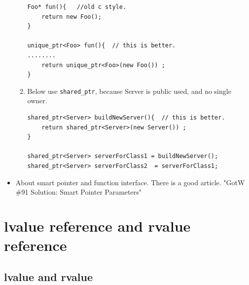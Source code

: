 \documentclass[a4paper,11pt,twoside]{book}
\begin{document}
\begin{itemize}
\begin{enumerate}
\begin{lstlisting}[numbers=none]
Foo* fun(){   //old c style.
	return new Foo();
}

unique_ptr<Foo> fun(){  // this is better.
........
	return unique_ptr<Foo>(new Foo()) ;
}
\end{lstlisting}

\item Below use \texttt{shared\_ptr}, because Server is public used, and no single owner.
\begin{lstlisting}[numbers=none]
shared_ptr<Server> buildNewServer(){  // this is better.
	return shared_ptr<Server>(new Server()) ;
}

shared_ptr<Server> serverForClass1 = buildNewServer();
shared_ptr<Server> serverForClass2  = serverForClass1;
\end{lstlisting}

\end{enumerate}

\item About smart pointer and function interface. There is a good article. "GotW \#91 Solution: Smart Pointer Parameters"
\end{itemize}




\chapter{lvalue reference and rvalue reference}
\section{lvalue and rvalue}
\end{document}
